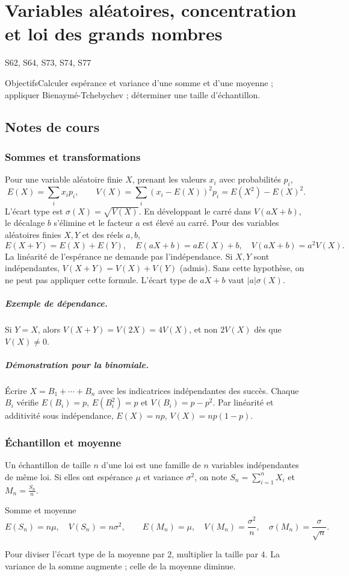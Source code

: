 \setcounter{chapter}{13}\chapter{Variables aléatoires, concentration et loi des grands nombres}\label{ch:14}

{\small\sffamily\color{teal}S62, S64, S73, S74, S77\par}

\begin{retenir}{Objectifs}Calculer espérance et variance d'une somme et d'une moyenne ; appliquer Bienaymé-Tchebychev ; déterminer une taille d'échantillon.\end{retenir}

\section{Notes de cours}
\subsection{Sommes et transformations}
Pour une variable aléatoire finie $X$, prenant les valeurs $x_i$ avec probabilités $p_i$,
\[E(X)=\sum_i x_ip_i,\qquad V(X)=\sum_i(x_i-E(X))^2p_i=E(X^2)-E(X)^2.\]
L'écart type est $\sigma(X)=\sqrt{V(X)}$. En développant le carré dans $V(aX+b)$, le décalage $b$ s'élimine et le facteur $a$ est élevé au carré.
Pour des variables aléatoires finies $X,Y$ et des réels $a,b$,
\[E(X+Y)=E(X)+E(Y),\quad E(aX+b)=aE(X)+b,\quad V(aX+b)=a^2V(X).\]
La linéarité de l'espérance ne demande pas l'indépendance. Si $X,Y$ sont indépendantes, $V(X+Y)=V(X)+V(Y)$ (admis). Sans cette hypothèse, on ne peut pas appliquer cette formule. L'écart type de $aX+b$ vaut $|a|\sigma(X)$.
\paragraph{Exemple de dépendance.} Si $Y=X$, alors $V(X+Y)=V(2X)=4V(X)$, et non $2V(X)$ dès que $V(X)\ne0$.
\paragraph{Démonstration pour la binomiale.} Écrire $X=B_1+\cdots+B_n$ avec les indicatrices indépendantes des succès. Chaque $B_i$ vérifie $E(B_i)=p$, $E(B_i^2)=p$ et $V(B_i)=p-p^2$. Par linéarité et additivité sous indépendance, $E(X)=np$, $V(X)=np(1-p)$.
\subsection{Échantillon et moyenne}
Un échantillon de taille $n$ d'une loi est une famille de $n$ variables indépendantes de même loi. Si elles ont espérance $\mu$ et variance $\sigma^2$, on note $S_n=\sum_{i=1}^nX_i$ et $M_n=\frac{S_n}{n}$.
\begin{retenir}{Somme et moyenne}
\[E(S_n)=n\mu,\quad V(S_n)=n\sigma^2,\qquad E(M_n)=\mu,\quad V(M_n)=\frac{\sigma^2}{n},\quad\sigma(M_n)=\frac\sigma{\sqrt n}.\]
\end{retenir}
Pour diviser l'écart type de la moyenne par $2$, multiplier la taille par $4$. La variance de la somme augmente ; celle de la moyenne diminue.
